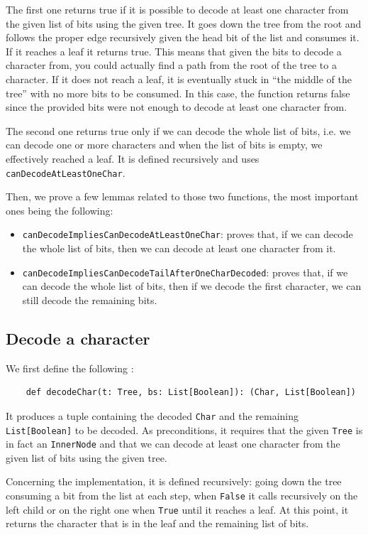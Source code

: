 \documentclass[a4paper,UKenglish,cleveref, autoref, thm-restate]{lipics-v2021}
\begin{document}
The first one returns true if it is possible to decode at least one character from the given list of bits using the given tree. 
It goes down the tree from the root and follows the proper edge recursively given the head bit of the list and consumes it. If it reaches a leaf it returns true. This means that given the bits to decode a character from, you could actually find a path from the root of the tree to a character. If it does not reach a leaf, it is eventually stuck in ``the middle of the tree'' with no more bits to be consumed. In this case, the function returns false since the provided bits were not enough to decode at least one character from.

The second one returns true only if we can decode the whole list of bits, i.e. we can decode one or more characters and when the list of bits is empty, we effectively reached a leaf. It is defined recursively and uses \lstinline{canDecodeAtLeastOneChar}.

Then, we prove a few lemmas related to those two functions, the most important ones being the following:
\begin{itemize}
    \item \lstinline{canDecodeImpliesCanDecodeAtLeastOneChar}: proves that, if we can decode the whole list of bits, then we can decode at least one character from it.
    \item \lstinline{canDecodeImpliesCanDecodeTailAfterOneCharDecoded}: proves that, if we can decode the whole list of bits, then if we decode the first character, we can still decode the remaining bits.
\end{itemize}

\subsection{Decode a character}
We first define the following :

\begin{lstlisting}
    def decodeChar(t: Tree, bs: List[Boolean]): (Char, List[Boolean])
\end{lstlisting}

It produces a tuple containing the decoded \lstinline{Char} and the remaining \lstinline{List[Boolean]} to be decoded.
As preconditions, it requires that the given \lstinline{Tree} is in fact an \lstinline{InnerNode} and that we can decode at least one character from the given list of bits using the given tree.

Concerning the implementation, it is defined recursively: going down the tree consuming a bit from the list at each step, when \lstinline{False} it calls recursively on the left child or on the right one when \lstinline{True} until it reaches a leaf. At this point,
it returns the character that is in the leaf and the remaining list of bits.
\end{document}
